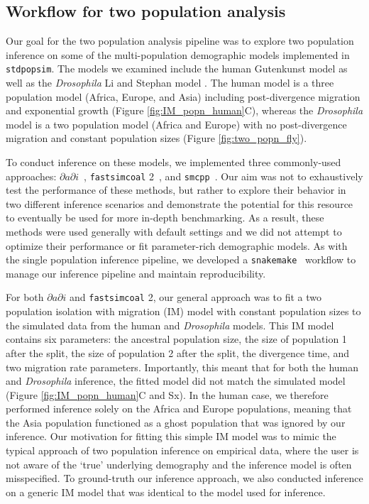 \documentclass[12pt,halfline,a4paper]{ouparticle}
\newcommand{\stdpopsim}{\texttt{stdpopsim}\xspace}
\newcommand{\dadi}{$\partial a \partial i$\xspace}
\newcommand{\smcpp}{\texttt{smcpp}\xspace}
\newcommand{\fastsimcoal}{\texttt{fastsimcoal}\xspace}
\begin{document}
\subsection*{Workflow for two population analysis}
Our goal for the two population analysis pipeline was to explore two population inference
on some of the multi-population demographic models implemented in \stdpopsim.
The models we examined include the human Gutenkunst model \citep{gutenkunst2009inferring} as
well as the \emph{Drosophila} Li and Stephan model \citep{li2006inferring}. The human
model is a three population model (Africa, Europe, and Asia) including post-divergence
migration and exponential growth (Figure \ref{fig:IM_popn_human}C), whereas the
\emph{Drosophila} model is a two population model (Africa and Europe) with no post-divergence
migration and constant population sizes (Figure \ref{fig:two_popn_fly}).

To conduct inference on these models, we implemented three commonly-used approaches:
\dadi~\citep{gutenkunst2009inferring}, \fastsimcoal2~\citep{excoffier2013robust},
and \smcpp~\citep{terhorst2017robust}. Our aim was not to exhaustively
test the performance of these methods, but rather to explore their behavior
in two different inference scenarios and demonstrate the potential for this resource to
eventually be used for more in-depth benchmarking. As a result, these methods were used
generally with default settings and we did not attempt to optimize their performance or fit
parameter-rich demographic models. As with the single population inference pipeline,
we developed a \texttt{snakemake}~\citep{koster2012snakemake} workflow to manage
our inference pipeline and maintain reproducibility.

For both \dadi and \fastsimcoal2, our general approach was to fit a two population
isolation with migration (IM) model with constant population sizes to the simulated
data from the human and \emph{Drosophila} models. This IM model contains six parameters:
the ancestral population size, the size of population 1 after the split, the size of
population 2 after the split, the divergence time, and two migration rate parameters.
Importantly, this meant that for both the human and \emph{Drosophila} inference, the
fitted model did not match the simulated model (Figure \ref{fig:IM_popn_human}C and Sx).
In the human case, we therefore performed inference solely on the Africa
and Europe populations, meaning that the Asia population functioned as a ghost
population that was ignored by our inference. Our motivation for fitting this simple
IM model was to mimic the typical approach of two population inference on empirical
data, where the user is not aware of the `true' underlying demography and the inference
model is often misspecified. To ground-truth our inference approach, we also conducted
inference on a generic IM model that was identical to the model used for inference.
\end{document}
